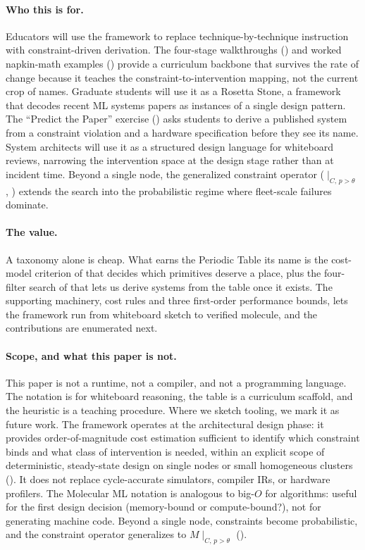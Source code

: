 \documentclass[10pt,twocolumn]{article}
\begin{document}
\paragraph{Who this is for.} Educators will use the framework to replace technique-by-technique instruction with constraint-driven derivation. The four-stage walkthroughs () and worked napkin-math examples () provide a curriculum backbone that survives the rate of change because it teaches the constraint-to-intervention mapping, not the current crop of names. Graduate students will use it as a Rosetta Stone, a framework that decodes recent ML systems papers as instances of a single design pattern. The ``Predict the Paper'' exercise () asks students to derive a published system from a constraint violation and a hardware specification before they see its name. System architects will use it as a structured design language for whiteboard reviews, narrowing the intervention space at the design stage rather than at incident time. Beyond a single node, the generalized constraint operator ($\mid_{C,\, p > \theta}$, ) extends the search into the probabilistic regime where fleet-scale failures dominate.

\paragraph{The value.} A taxonomy alone is cheap. What earns the Periodic Table its name is the cost-model criterion of  that decides which primitives deserve a place, plus the four-filter search of  that lets us derive systems from the table once it exists. The supporting machinery, cost rules and three first-order performance bounds, lets the framework run from whiteboard sketch to verified molecule, and the contributions are enumerated next.

\paragraph{Scope, and what this paper is not.} This paper is not a runtime, not a compiler, and not a programming language. The notation is for whiteboard reasoning, the table is a curriculum scaffold, and the heuristic is a teaching procedure. Where we sketch tooling, we mark it as future work. The framework operates at the architectural design phase: it provides order-of-magnitude cost estimation sufficient to identify which constraint binds and what class of intervention is needed, within an explicit scope of deterministic, steady-state design on single nodes or small homogeneous clusters (). It does not replace cycle-accurate simulators, compiler IRs, or hardware profilers. The Molecular ML notation is analogous to big-$O$ for algorithms: useful for the first design decision (memory-bound or compute-bound?), not for generating machine code. Beyond a single node, constraints become probabilistic, and the constraint operator generalizes to $M \mid_{C,\, p > \theta}$ ().
\end{document}
